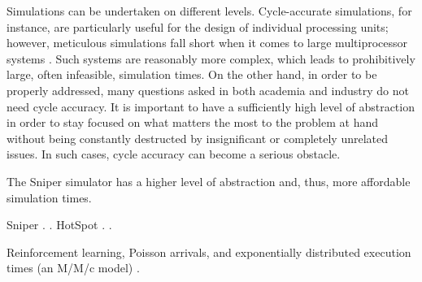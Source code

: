 Simulations can be undertaken on different levels. Cycle-accurate simulations,
for instance, are particularly useful for the design of individual processing
units; however, meticulous simulations fall short when it comes to large
multiprocessor systems \cite{carlson2011}. Such systems are reasonably more
complex, which leads to prohibitively large, often infeasible, simulation times.
On the other hand, in order to be properly addressed, many questions asked in
both academia and industry do not need cycle accuracy. It is important to have a
sufficiently high level of abstraction in order to stay focused on what matters
the most to the problem at hand without being constantly destructed by
insignificant or completely unrelated issues. In such cases, cycle accuracy can
become a serious obstacle.

The Sniper simulator has a higher level of abstraction \cite{carlson2011} and,
thus, more affordable simulation times.

Sniper \cite{carlson2011}.
 \cite{li2009}.
HotSpot \cite{skadron2004}.
 \cite{sridhar2010}.

Reinforcement learning, Poisson arrivals, and exponentially distributed
execution times (an M/M/c model) \cite{lu2015}.
